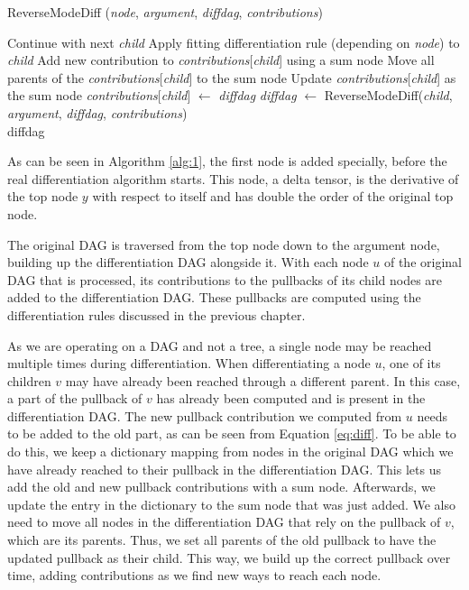 \documentclass[12pt, a4paper]{report}
\begin{document}
\begin{algorithm}
    \caption{ReverseModeDiff (\textit{node}, \textit{argument}, \textit{diffdag}, \textit{contributions})}\label{alg:2}
    \begin{algorithmic}
                \State Continue with next \textit{child}
            \EndIf
            \State Apply fitting differentiation rule (depending on \textit{node}) to \textit{child}
                \State Add new contribution to \textit{contributions}[\textit{child}] using a sum node
                \State Move all parents of the \textit{contributions}[\textit{child}] to the sum node
                \State Update \textit{contributions}[\textit{child}] as the sum node
            \Else
                \State \textit{contributions}[\textit{child}] $\gets$ \textit{diffdag}
                \State \textit{diffdag} $\gets$ ReverseModeDiff(\textit{child}, \textit{argument}, \textit{diffdag}, \textit{contributions})
            \EndIf
        \EndFor \\
        \Return diffdag
    \end{algorithmic}
\end{algorithm}

As can be seen in Algorithm \ref{alg:1}, the first node is added specially, before the real differentiation algorithm starts.
This node, a delta tensor, is the derivative of the top node $y$ with respect to itself and has double the order of the original top node.

The original DAG is traversed from the top node down to the argument node, building up the differentiation DAG alongside it.
With each node $u$ of the original DAG that is processed, its contributions to the pullbacks of its child nodes are added to the differentiation DAG.
These pullbacks are computed using the differentiation rules discussed in the previous chapter.

As we are operating on a DAG and not a tree, a single node may be reached multiple times during differentiation.
When differentiating a node $u$, one of its children $v$ may have already been reached through a different parent.
In this case, a part of the pullback of $v$ has already been computed and is present in the differentiation DAG.
The new pullback contribution we computed from $u$ needs to be added to the old part, as can be seen from Equation \ref{eq:diff}.
To be able to do this, we keep a dictionary mapping from nodes in the original DAG which we have already reached to their pullback in the differentiation DAG.
This lets us add the old and new pullback contributions with a sum node.
Afterwards, we update the entry in the dictionary to the sum node that was just added.
We also need to move all nodes in the differentiation DAG that rely on the pullback of $v$, which are its parents.
Thus, we set all parents of the old pullback to have the updated pullback as their child.
This way, we build up the correct pullback over time, adding contributions as we find new ways to reach each node.
\end{document}

